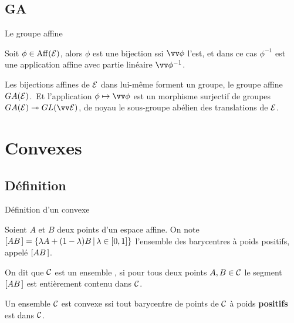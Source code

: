 \documentclass[bigger]{m53beamer}
\begin{document}
\subsection{GA}
  \begin{frame}{Le groupe affine}
    \begin{proposition}
      Soit $\phi\in\operatorname{Aff}(\mathcal{E})$, alors $\phi$ est une bijection ssi $\vv\phi$ l'est, et dans ce cas $\phi^{-1}$ est une application affine avec partie linéaire $\vv\phi^{-1}$.
    \end{proposition}\pause
    \begin{proposition}
      Les bijections affines de $\mathcal{E}$ dans lui-même forment un groupe, le groupe affine $GA(\mathcal{E})$.\pause\ Et l'application $\phi\mapsto\vv\phi$ est un morphisme surjectif de groupes $GA(\ens{E})\twoheadrightarrow GL(\ev{E})$\pause, de noyau le sous-groupe abélien des translations de $\mathcal{E}$.
    \end{proposition}
  \end{frame}
\section{Convexes}
\subsection{Définition}
\begin{frame}{Définition d'un convexe}
  \begin{definition}
    Soient $A$ et $B$ deux points d'un espace affine. On note $[{AB}\kern.14em]=\left\{\lambda A + (1-\lambda)B\,|\, \lambda \in [0,1]\right\}$ l'ensemble des barycentres à poids positifs, appelé  $[{AB}\kern.14em]$.
  \end{definition}\pause
  \begin{definition}
    On dit que $\mathcal{C}$ est un ensemble , si pour tous deux points $A,B \in \mathcal{C}$ le segment $[{AB}\kern.14em]$ est entièrement contenu dans $\mathcal{C}$.
  \end{definition}\pause
  \begin{proposition}
    Un ensemble $\mathcal{C}$ est convexe ssi tout barycentre de points de $\mathcal{C}$ à poids \textbf{positifs} est dans $\mathcal{C}$.
  \end{proposition}
\end{frame}
\end{document}
